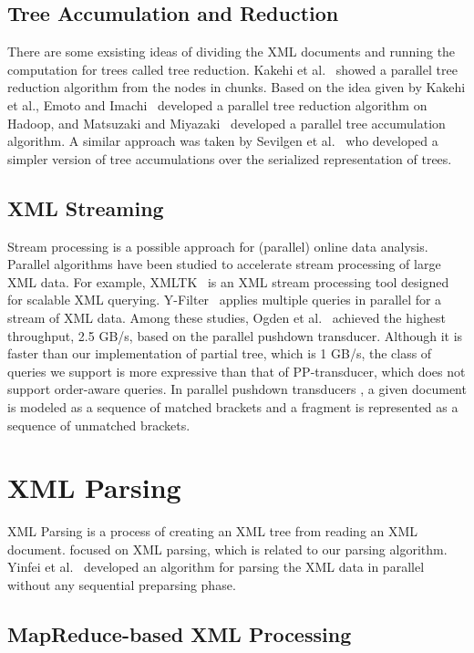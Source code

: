 \subsection{Tree Accumulation and Reduction}

There are some exsisting ideas of dividing the XML documents and running the
computation for trees called tree reduction. Kakehi et al.~\cite{KaME07} showed
a parallel tree reduction algorithm from the nodes in chunks. Based on the idea
given by Kakehi et al., Emoto and Imachi~\cite{EmIm12} developed a parallel tree
reduction algorithm on Hadoop, and Matsuzaki and Miyazaki~\cite{MaMi16}
developed a parallel tree accumulation algorithm. A similar approach was taken
by Sevilgen et al.~\cite{SAFu05} who developed a simpler version of tree
accumulations over the serialized representation of trees.

\subsection{XML Streaming}

Stream processing is a possible approach for (parallel) online data analysis.
Parallel algorithms have been studied to accelerate stream processing
of large XML data. For example, XMLTK~\cite{AGGR02} is an XML stream processing
tool designed for scalable XML querying. Y-Filter~\cite{ZhPC10} applies multiple
queries in parallel for a stream of XML data. Among these studies, Ogden et
al.~\cite{OgTP13} achieved the highest throughput, 2.5 GB/s, based on the
parallel pushdown transducer. Although it is faster than our implementation of
partial tree, which is 1 GB/s, the class of queries we support is more
expressive than that of PP-transducer, which does not support order-aware
queries. In parallel pushdown transducers \cite{LiZZ17}, a given document is
modeled as a sequence of matched brackets and a fragment is represented as a
sequence of unmatched brackets.

\section{XML Parsing}

XML Parsing is a process of creating an XML tree from reading an XML document. 
\cite{PLZC07,WZYu08} focused on XML parsing, which is related to our parsing
algorithm. Yinfei et al.~\cite{PaZC08} developed an algorithm for parsing the
XML data in parallel without any sequential preparsing phase.


\subsection{MapReduce-based XML Processing}
\label{sec:mapreduce}

